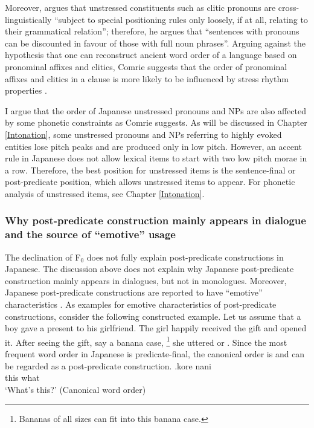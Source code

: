 Moreover,  argues that unstressed constituents such as clitic pronouns are cross-linguistically ``subject to special positioning rules only loosely, if at all, relating to their grammatical relation'';
therefore, he argues that ``sentences with pronouns can be discounted in favour of those with full noun phrases''.
Arguing against the hypothesis \cite{givon79}
that one can reconstruct ancient word order of a language based on pronominal affixes and clitics,
Comrie suggests that the order of pronominal affixes and clitics in a clause is more likely to be influenced by stress rhythm properties \cite[][p.~218]{comrie89}.

I argue that the order of Japanese unstressed pronouns and NPs are also affected by some phonetic constraints as Comrie suggests.
As will be discussed in Chapter \ref{Intonation},
some unstressed pronouns and NPs referring to highly evoked entities
lose pitch peaks and are produced only in low pitch.
However, an accent rule in Japanese does not allow lexical items to start with two low pitch morae in a row.
Therefore, the best position for unstressed items is the sentence-final or post-predicate position,
which allows unstressed items to appear.
For phonetic analysis of unstressed items,
see Chapter \ref{Intonation}.


\subsubsection{Why post-predicate construction mainly appears in dialogue and the source of ``emotive'' usage}

The declination of F$_{0}$ does not fully explain post-predicate constructions in Japanese.
The discussion above does not explain why Japanese post-predicate construction mainly appears in dialogues, but not in monologues.
Moreover, Japanese post-predicate constructions are reported to have ``emotive'' characteristics \cite{ono07}.
As examples for emotive characteristics of post-predicate constructions, consider the following constructed example.
Let us assume that a boy gave a present to his girlfriend.
The girl happily received the gift and opened it.
After seeing the gift, say a banana case,%
	\footnote{
	Bananas of all sizes can fit into this banana case.
	}
she uttered \Next or \NNext.
Since the most frequent word order in Japanese is predicate-final,
the canonical order is \Next and
\NNext can be regarded as a post-predicate construction.
%
\exg.\label{korenani}kore nani \\
	this what \\
	`What's this?'
	\hfill{(Canonical word order)}

